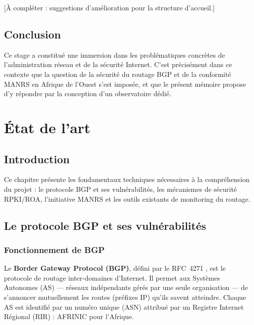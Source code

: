 \documentclass{eneam}
\begin{document}
[À compléter : suggestions d'amélioration pour la structure d'accueil.]

\section{Conclusion}

Ce stage a constitué une immersion dans les problématiques concrètes de l'administration réseau et de la sécurité Internet. C'est précisément dans ce contexte que la question de la sécurité du routage BGP et de la conformité MANRS en Afrique de l'Ouest s'est imposée, et que le présent mémoire propose d'y répondre par la conception d'un observatoire dédié.


\chapter{État de l'art}

\section{Introduction}

Ce chapitre présente les fondamentaux techniques nécessaires à la compréhension du projet : le protocole BGP et ses vulnérabilités, les mécanismes de sécurité RPKI/ROA, l'initiative MANRS et les outils existants de monitoring du routage.

\section{Le protocole BGP et ses vulnérabilités}

\subsection{Fonctionnement de BGP}

Le \textbf{Border Gateway Protocol (BGP)}, défini par le RFC~4271 \cite{RFC4271}, est le protocole de routage inter-domaines d'Internet. Il permet aux Systèmes Autonomes (AS) --- réseaux indépendants gérés par une seule organisation --- de s'annoncer mutuellement les routes (préfixes IP) qu'ils savent atteindre. Chaque AS est identifié par un numéro unique (ASN) attribué par un Registre Internet Régional (RIR) : AFRINIC pour l'Afrique.
\end{document}
